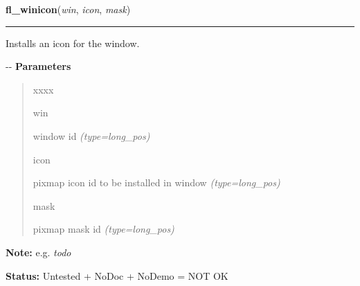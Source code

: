     \vspace{0.5ex}

\hspace{.8\funcindent}\begin{boxedminipage}{\funcwidth}

    \raggedright \textbf{fl\_winicon}(\textit{win}, \textit{icon}, \textit{mask})

    \vspace{-1.5ex}

    \rule{\textwidth}{0.5\fboxrule}
\setlength{\parskip}{2ex}

Installs an icon for the window.

-{}-
\setlength{\parskip}{1ex}
      \textbf{Parameters}
      \vspace{-1ex}

      \begin{quote}
        \begin{Ventry}{xxxx}

          \item[win]


window id
            {\it (type=long\_pos)}

          \item[icon]


pixmap icon id to be installed in window
            {\it (type=long\_pos)}

          \item[mask]


pixmap mask id
            {\it (type=long\_pos)}

        \end{Ventry}

      \end{quote}

\textbf{Note:} 
e.g. \emph{todo}


\textbf{Status:} 
Untested + NoDoc + NoDemo = NOT OK


    \end{boxedminipage}

    \label{xformslib:flxbasic:fl_winbackground}

    \vspace{0.5ex}

